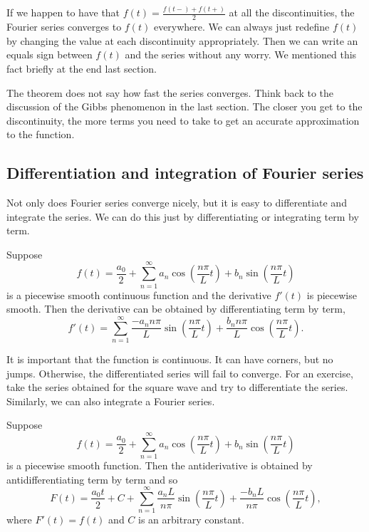 If we happen to have that
$f(t) = \frac{f(t-)+f(t+)}{2}$ at all the discontinuities, the Fourier series
converges to $f(t)$ everywhere.  We can always just redefine $f(t)$
by changing the value at each discontinuity appropriately.  Then we can write
an equals sign between $f(t)$ and the series without any worry.
We mentioned this fact
briefly at the end last section.

The theorem does not say how fast the series converges.
Think back to the discussion of the Gibbs phenomenon in the last section.
The closer you get to the discontinuity, the more terms you need to take
to get an accurate approximation to the function.

\subsection{Differentiation and integration of Fourier series}

Not only does Fourier series converge nicely, but it is easy to differentiate
and integrate the series.  We can do this just by differentiating or
integrating term by term.

\begin{theorem}
Suppose
\begin{equation*}
f(t) = \frac{a_0}{2} + \sum_{n=1}^\infty a_n \cos \left( \frac{n \pi}{L} t
\right)
+ b_n \sin \left( \frac{n \pi}{L} t \right)
\end{equation*}
is a piecewise smooth continuous function and the derivative $f'(t)$ is
piecewise smooth.  Then the derivative can be
obtained by differentiating term by term,
\begin{equation*}
f'(t) = \sum_{n=1}^\infty \frac{-a_n n \pi}{L} 
\sin \left( \frac{n \pi}{L} t \right)
+ \frac{b_n n \pi}{L} \cos \left( \frac{n \pi}{L} t \right) .
\end{equation*}
\end{theorem}

It is important that the function is continuous.  It can have corners, but no
jumps.  Otherwise, the differentiated series will fail to converge.  For an
exercise, take the series obtained for the square wave and try to
differentiate the series.  Similarly, we can also integrate a Fourier series.

\begin{theorem}
Suppose
\begin{equation*}
f(t) = \frac{a_0}{2} + \sum_{n=1}^\infty
a_n \cos \left( \frac{n \pi}{L} t \right)
+ b_n \sin \left( \frac{n \pi}{L} t \right)
\end{equation*}
is a piecewise smooth function.  Then the antiderivative is
obtained by antidifferentiating term by term and so
\begin{equation*}
F(t) = \frac{a_0 t}{2} + C + \sum_{n=1}^\infty
\frac{a_n L}{n \pi} \sin \left( \frac{n \pi}{L} t \right)
+ \frac{-b_n L}{n \pi}  \cos \left( \frac{n \pi}{L} t \right) ,
\end{equation*}
where $F'(t) = f(t)$ and $C$ is an arbitrary constant.
\end{theorem}

